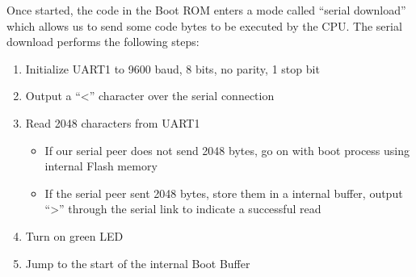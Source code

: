 \documentclass[conference]{IEEEtran}
\newcommand{\nota}[1]{}
\begin{document}
\nota{Afortunadamente, en un reinicio, el Cirrus EP9307, en conjunción
con el software de la Boot ROM, operan en un modo llamado 
``download en serie'', que nos permite enviar unos pocos
bytes para ser ejecutados por la CPU. Internamente, en un evento de reinicio,
estos componentes (CPU y Boot ROM) trabajan de la siguiente manera:}

Once started, the code in the Boot ROM enters a mode called 
``serial download'' which allows us to send some code bytes to be executed by the CPU. 
The serial download performs the following steps:

\nota{\begin{enumerate}
\item Se inicializa el UART1 a 9600 baudios, 8 bits, sin paridad, 1 bit de stop.
\item Se envía por esa conexión serie el caracter ``\textgreater''
\item Se leen desde el sistema embebido, 2048 bytes provenientes
de la conexión serie, y se almacenan en una buffer de inicio interno.
\item Decisión:
\begin{itemize}
\item Si el otro extremo de la conexión serie (por ejemplo, nuestra PC) no envía los 2048 bytes, el sistema continúa el proceso de arranque utilizando la memoria interna Flash.
\item Si el extremo de la conexión serie envió los 2048 bytes, entonces se envía desde el sistema (SOC) otro caracter ``\textgreater'' a través de la conexión serie, para indicar que 
se leyeron correctamente.
\end{itemize}
\item Finalmente, la CPU ``salta'' a la dirección del buffer de boot interno,
para continuar leyendo instrucciones desde
los 2048 bytes leídos.
\end{enumerate} } 

\begin{enumerate}
\item Initialize UART1 to 9600 baud, 8 bits, no parity, 1 stop bit
\item Output a ``\textless'' character over the serial connection
\item Read 2048 characters from UART1\nota{, store these in the internal Boot Buffer \nota{ (alias for the Ethernet Mac buffer)}}
\begin{itemize}
	\item If our serial peer does not send 2048 bytes, go on with boot process using internal Flash  memory
	\item If the serial peer sent 2048 bytes, store them in a internal buffer, output ``\textgreater'' through the serial link to indicate a successful read
\end{itemize}
\item Turn on green LED
\item Jump to the start of the internal Boot Buffer
\end{enumerate}
\end{document}
